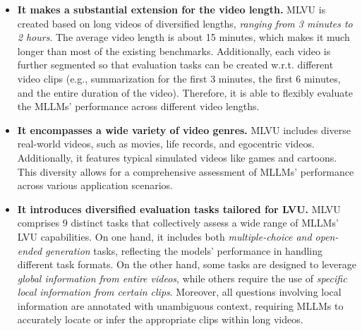 \begin{table*}[t!]
\begin{adjustbox}{max width=\textwidth}
\begin{tabular}
\bottomrule
\end{tabular}
\end{adjustbox}
\vspace{-0.2cm}
\caption{Comparison of MLVU with existing benchmarks, including the number of videos (\textbf{\#Videos}), number of QA pairs (\textbf{\#QA pairs}), average video length (\textbf{Len.}), presence of \textbf{Close-Ended} tasks, presence of \textbf{Open-Ended} tasks, inclusion of various video genres (\textbf{Various Genres}), coverage of multiple duration levels (\textbf{Multi-Level}), inclusion of multiple dimensions of LVU tasks (\textbf{Multi-Dimension}), and questions involving local information with clear referring context rather than direct timestamps~\cite{moviechat2023} or well-known narrative elements~\cite{movienet2020,llama-vid2023} (\textbf{Referring QA}). The first block represents short video understanding benchmarks, and the second block represents long video understanding benchmarks. $^*$ denotes work concurrent with MLVU.} 
\vspace{-0.5cm}
\label{tab:comparison}
\end{table*}

\begin{itemize}%
     \item \textbf{It makes a substantial extension for the video length.} MLVU is created based on long videos of diversified lengths, \textit{ranging from 3 minutes to 2 hours}. The average video length is about 15 minutes, which makes it much longer than most of the existing benchmarks. Additionally, each video is further segmented so that evaluation tasks can be created w.r.t. different video clips (e.g., summarization for the first 3 minutes, the first 6 minutes, and the entire duration of the video). Therefore, it is able to flexibly evaluate the MLLMs' performance across different video lengths. 

     \item \textbf{It encompasses a wide variety of video genres.} MLVU includes diverse real-world videos, such as movies, life records, and egocentric videos. Additionally, it features typical simulated videos like games and cartoons. This diversity allows for a comprehensive assessment of MLLMs' performance across various application scenarios.

     \item \textbf{It introduces diversified evaluation tasks tailored for LVU.} MLVU comprises 9 distinct tasks that collectively assess a wide range of MLLMs' LVU capabilities. On one hand, it includes both \textit{multiple-choice and open-ended generation} tasks, reflecting the models' performance in handling different task formats. On the other hand, some tasks are designed to leverage \textit{global information from entire videos}, while others require the use of \textit{specific local information from certain clips}. Moreover, all questions involving local information are annotated with unambiguous context, requiring MLLMs to accurately locate or infer the appropriate clips within long videos.
\end{itemize}

